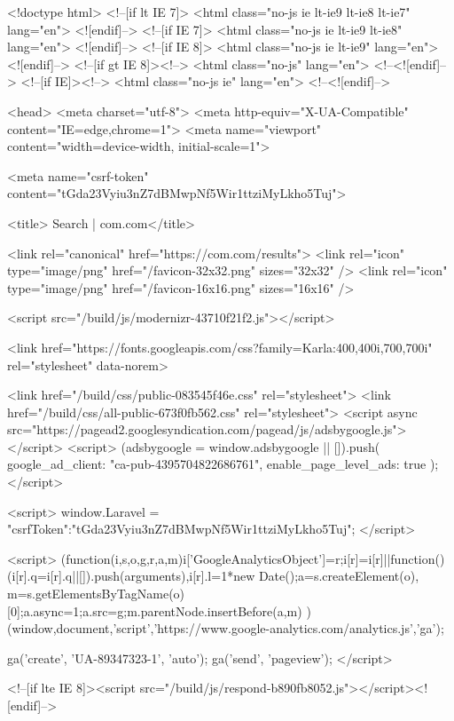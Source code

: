 <!doctype html>
<!--[if lt IE 7]>      <html class="no-js ie lt-ie9 lt-ie8 lt-ie7" lang="en"> <![endif]-->
<!--[if IE 7]>         <html class="no-js ie lt-ie9 lt-ie8" lang="en"> <![endif]-->
<!--[if IE 8]>         <html class="no-js ie lt-ie9" lang="en"> <![endif]-->
<!--[if gt IE 8]><!--> <html class="no-js" lang="en"> <!--<![endif]-->
<!--[if IE]><!--> <html class="no-js ie" lang="en"> <!--<![endif]-->

<head>
    <meta charset="utf-8">
    <meta http-equiv="X-UA-Compatible" content="IE=edge,chrome=1">
    <meta name="viewport" content="width=device-width, initial-scale=1">

    
    <meta name="csrf-token" content="tGda23Vyiu3nZ7dBMwpNf5Wir1ttziMyLkho5Tuj">

    <title>    Search
 | com.com</title>
    
    <link rel="canonical" href="https://com.com/results">
    <link rel="icon" type="image/png" href="/favicon-32x32.png" sizes="32x32" />
    <link rel="icon" type="image/png" href="/favicon-16x16.png" sizes="16x16" />

    
    <script src="/build/js/modernizr-43710f21f2.js"></script>

    <link href="https://fonts.googleapis.com/css?family=Karla:400,400i,700,700i" rel="stylesheet" data-norem>

        <link href="/build/css/public-083545f46e.css" rel="stylesheet">
    <link href="/build/css/all-public-673f0fb562.css" rel="stylesheet">
    <script async src="https://pagead2.googlesyndication.com/pagead/js/adsbygoogle.js"></script>
    <script>
        (adsbygoogle = window.adsbygoogle || []).push({
            google_ad_client: "ca-pub-4395704822686761",
            enable_page_level_ads: true
        });
    </script>
    
    <script>
      window.Laravel = {"csrfToken":"tGda23Vyiu3nZ7dBMwpNf5Wir1ttziMyLkho5Tuj"};
    </script>

    <script>
        (function(i,s,o,g,r,a,m){i['GoogleAnalyticsObject']=r;i[r]=i[r]||function(){
        (i[r].q=i[r].q||[]).push(arguments)},i[r].l=1*new Date();a=s.createElement(o),
        m=s.getElementsByTagName(o)[0];a.async=1;a.src=g;m.parentNode.insertBefore(a,m)
        })(window,document,'script','https://www.google-analytics.com/analytics.js','ga');

        ga('create', 'UA-89347323-1', 'auto');
        ga('send', 'pageview');
    </script>

    
    <!--[if lte IE 8]><script src="/build/js/respond-b890fb8052.js"></script><![endif]-->

